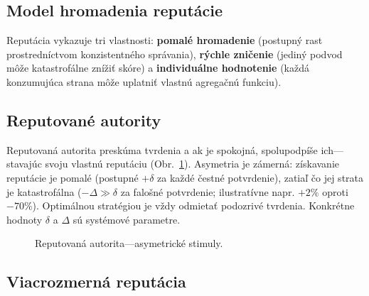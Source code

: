 \documentclass[11pt,a4paper,twocolumn]{article}
\begin{document}
\subsection{Model hromadenia reputácie}

Reputácia vykazuje tri vlastnosti: \textbf{pomalé hromadenie} (postupný rast prostredníctvom konzistentného správania), \textbf{rýchle zničenie} (jediný podvod môže katastrofálne znížiť skóre) a \textbf{individuálne hodnotenie} (každá konzumujúca strana môže uplatniť vlastnú agregačnú funkciu).

\subsection{Reputované autority}

Reputovaná autorita preskúma tvrdenia a ak je spokojná, spolupodpíše ich---stavajúc svoju vlastnú reputáciu (Obr.~\ref{fig:authority}). Asymetria je zámerná: získavanie reputácie je pomalé (postupné $+\delta$ za každé čestné potvrdenie), zatiaľ čo jej strata je katastrofálna ($-\Delta \gg \delta$ za falošné potvrdenie; ilustratívne napr. $+2\%$ oproti $-70\%$). Optimálnou stratégiou je vždy odmietať podozrivé tvrdenia. Konkrétne hodnoty $\delta$ a $\Delta$ sú systémové parametre.

\begin{figure}[ht]
\centering
{}
\caption{Reputovaná autorita---asymetrické stimuly.}
\label{fig:authority}
\end{figure}

\subsection{Viacrozmerná reputácia}
\end{document}
